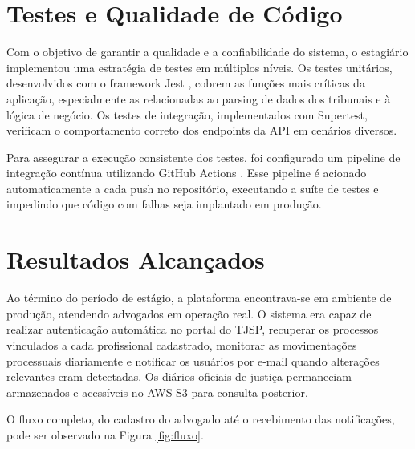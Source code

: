 \documentclass[
	12pt,
	oneside,
	a4paper,
	brazil,
	sumario=tradicional
]{abntex2}
\begin{document}
\section{Testes e Qualidade de Código}

Com o objetivo de garantir a qualidade e a confiabilidade do sistema, o estagiário implementou uma estratégia de testes em múltiplos níveis. Os testes unitários, desenvolvidos com o framework Jest \cite{jest_docs}, cobrem as funções mais críticas da aplicação, especialmente as relacionadas ao parsing de dados dos tribunais e à lógica de negócio. Os testes de integração, implementados com Supertest, verificam o comportamento correto dos endpoints da API em cenários diversos.

Para assegurar a execução consistente dos testes, foi configurado um pipeline de integração contínua utilizando GitHub Actions \cite{github_actions_docs}. Esse pipeline é acionado automaticamente a cada push no repositório, executando a suíte de testes e impedindo que código com falhas seja implantado em produção.

\section{Resultados Alcançados}

Ao término do período de estágio, a plataforma encontrava-se em ambiente de produção, atendendo advogados em operação real. O sistema era capaz de realizar autenticação automática no portal do TJSP, recuperar os processos vinculados a cada profissional cadastrado, monitorar as movimentações processuais diariamente e notificar os usuários por e-mail quando alterações relevantes eram detectadas. Os diários oficiais de justiça permaneciam armazenados e acessíveis no AWS S3 para consulta posterior.

O fluxo completo, do cadastro do advogado até o recebimento das notificações, pode ser observado na Figura \ref{fig:fluxo}.
\end{document}
